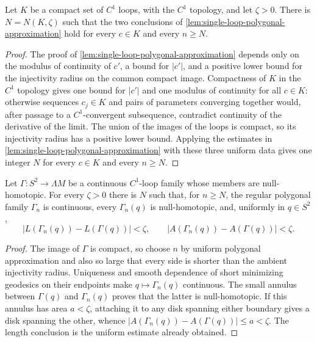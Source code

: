 \begin{theorem}
\label{lem:compact-family-polygonal-approximation}
\notready
Let $K$ be a compact set of $C^1$ loops, with the $C^1$ topology, and let
$\zeta>0$.  There is $N=N(K,\zeta)$ such that the two conclusions of
\ref{lem:single-loop-polygonal-approximation} hold for every $c\in K$ and
every $n\ge N$.
\end{theorem}
\begin{proof}
The proof of \ref{lem:single-loop-polygonal-approximation} depends only on the
modulus of continuity
of $c'$, a bound for $|c'|$, and a positive lower bound for the injectivity
radius on the common compact image.  Compactness of $K$ in the $C^1$ topology
gives one bound for $|c'|$ and one modulus of continuity for all $c\in K$:
otherwise sequences $c_j\in K$ and pairs of parameters converging together
would, after passage to a $C^1$-convergent subsequence, contradict continuity
of the derivative of the limit.  The union of the images of the loops is
compact, so its injectivity radius has a positive lower bound.  Applying the
estimates in \ref{lem:single-loop-polygonal-approximation} with these three
uniform data gives one
integer $N$ for every $c\in K$ and every $n\ge N$.
\end{proof}

\begin{theorem}
\label{cor:sphere-family-polygonal-approximation}
\notready
Let $\Gamma\colon S^2\to\Lambda M$ be a continuous $C^1$-loop family whose
members are null-homotopic.  For every $\zeta>0$ there is $N$ such that, for
$n\ge N$, the regular polygonal family $\Gamma_n$ is continuous, every
$\Gamma_n(q)$ is null-homotopic, and, uniformly in $q\in S^2$,
\[
 |L(\Gamma_n(q))-L(\Gamma(q))|<\zeta,
 \qquad
 |A(\Gamma_n(q))-A(\Gamma(q))|<\zeta.
\]
\end{theorem}
\begin{proof}
The image of $\Gamma$ is compact, so choose $n$ by uniform polygonal
approximation and also so large that every side is shorter than the ambient
injectivity radius.  Uniqueness and smooth dependence of short minimizing
geodesics on their endpoints make $q\mapsto\Gamma_n(q)$ continuous.  The
small annulus between $\Gamma(q)$ and $\Gamma_n(q)$ proves that the latter is
null-homotopic.  If this annulus has area $a<\zeta$, attaching it to any disk
spanning either boundary gives a disk spanning the other, whence
$|A(\Gamma_n(q))-A(\Gamma(q))|\le a<\zeta$.  The length conclusion is the
uniform estimate already obtained.
\end{proof}

